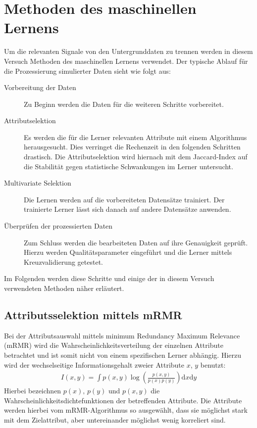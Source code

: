 \section{Methoden des maschinellen Lernens}
\label{sec:mashlearning}

Um die relevanten Signale von den Untergrunddaten zu trennen werden in diesem Versuch Methoden des maschinellen Lernens verwendet.
Der typische Ablauf für die Prozessierung simulierter Daten sieht wie folgt aus:
\begin{description}

\item[Vorbereitung der Daten] Zu Beginn werden die Daten für die weiteren Schritte vorbereitet.
\item[Attributselektion] Es werden die für die Lerner relevanten Attribute mit einem Algorithmus herausgesucht. 
Dies verringet die Rechenzeit in den folgenden Schritten drastisch.
Die Attributselektion wird hiernach mit dem Jaccard-Index auf die Stabilität gegen statistische Schwankungen im Lerner untersucht.
\item[Multivariate Selektion] Die Lernen werden auf die vorbereiteten Datensätze trainiert. 
Der trainierte Lerner lässt sich danach auf andere Datensätze anwenden.
\item[Überprüfen der prozessierten Daten] Zum Schluss werden die bearbeiteten Daten auf ihre Genauigkeit geprüft. 
Hierzu werden Qualitätsparameter eingeführt und die Lerner mittels Kreuzvalidierung getestet.

\end{description}

Im Folgenden werden diese Schritte und einige der in diesem Versuch verwendeten Methoden näher erläutert.

\subsection{Attributsselektion mittels mRMR}
\label{sec:mRMR}

Bei der Attributsauswahl mittels minimum Redundancy Maximum Relevance (mRMR) wird die Wahrscheinlichkeitsverteilung der einzelnen Attribute betrachtet und ist somit nicht von einem spezifischen Lerner abhängig.
Hierzu wird der wechselseitige Informationsgehalt zweier Attribute $x$, $y$ benutzt:
\begin{align*}
	I(x,y)=\int p(x,y)\log \left( \frac{p(x,y)}{p(x)p(y)}  \right)\textrm{d}x\textrm{d}y
\end{align*}
Hierbei bezeichnen $p(x),\, p(y)$ und $p(x,y)$ die Wahrscheinlichkeitsdichtefunktionen der betreffenden Attribute. 
Die Attribute werden hierbei vom mRMR-Algorithmus so ausgewählt, dass sie möglichst stark mit dem Zielattribut, aber untereinander möglichst wenig korreliert sind.

